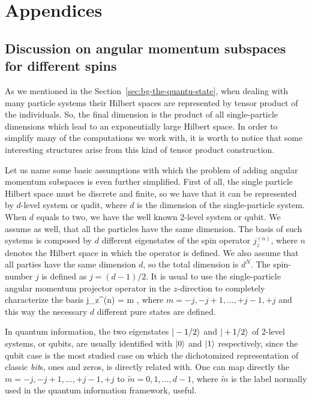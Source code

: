 \renewcommand\thesubsection{\Alph{subsection}}
\section*{Appendices}

\subsection{Discussion on angular momentum subspaces for different spins}
\label{app:angular-subspaces}

As we mentioned in the Section~\ref{sec:bg-the-quantu-state}, when dealing with many particle systems their Hilbert spaces are represented by tensor product of the individuals.
So, the final dimension is the product of all single-particle dimensions which lead to an exponentially large Hilbert space.
In order to simplify many of the computations we work with, it is worth to notice that some interesting structures arise from this kind of tensor product construction.

Let us name some basic assumptions with which the problem of adding angular momentum subspaces is even further simplified.
First of all, the single particle Hilbert space must be discrete and finite, so we have that it can be represented by $d$-level system or qudit, where $d$ is the dimension of the single-particle system.
When $d$ equals to two, we have the well known 2-level system or qubit.
We assume as well, that all the particles have the same dimension.
The basis of such systems is composed by $d$ different eigenstates of the spin operator $j_z^{(n)}$, where $n$ denotes the Hilbert space in which the operator is defined.
We also assume that all parties have the same dimension $d$, so the total dimension is $d^N$.
The spin-number $j$ is defined as $j=(d-1)/2$.
It is usual to use the single-particle angular momentum projector operator in the $z$-direction to completely characterize the basis
\be
  j_z^{(n)} = m ,
\ee
where $m = -j,-j+1,\dots,+j-1,+j$ and this way the necessary $d$ different pure states are defined.

In quantum information, the two eigenstates $\vert -1/2 \rangle$ and $\vert +1/2 \rangle$ of 2-level systems, or qubits, are usually identified with $\vert 0 \rangle$ and $\vert 1 \rangle$ respectively, since the qubit case is the most studied case on which the dichotomized representation of classic \emph{bit}s, ones and zeros, is directly related with.
One can map directly the $m=-j,-j+1,\dots,+j-1,+j$ to $\tilde{m}=0,1,\dots,d-1$, where $\tilde{m}$ is the label normally used in the quantum information framework, useful.

